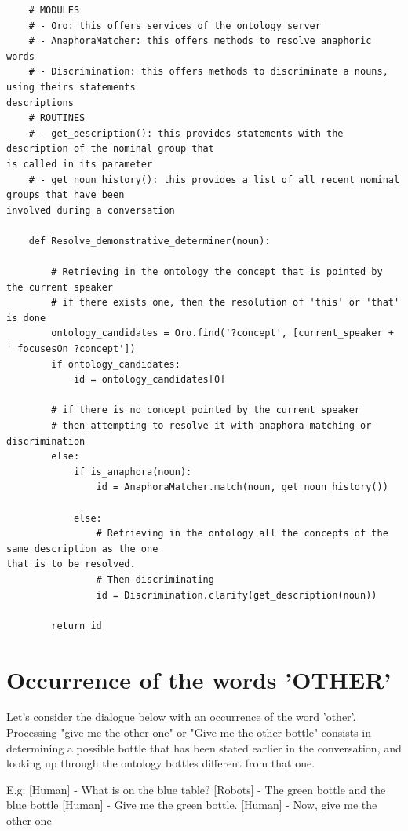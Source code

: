 \documentclass[twoside,a4paper,10pt]{report}
\newcommand{\dokutitleleveltree}[1]{\section{#1}}
\begin{document}
\lstset{language=python}
\begin{lstlisting}
    # MODULES
    # - Oro: this offers services of the ontology server
    # - AnaphoraMatcher: this offers methods to resolve anaphoric words
    # - Discrimination: this offers methods to discriminate a nouns, using theirs statements
descriptions
    # ROUTINES
    # - get_description(): this provides statements with the description of the nominal group that
is called in its parameter
    # - get_noun_history(): this provides a list of all recent nominal groups that have been
involved during a conversation 
    
    def Resolve_demonstrative_determiner(noun):
        
        # Retrieving in the ontology the concept that is pointed by the current speaker
        # if there exists one, then the resolution of 'this' or 'that' is done
        ontology_candidates = Oro.find('?concept', [current_speaker + ' focusesOn ?concept'])
        if ontology_candidates:
            id = ontology_candidates[0]
        
        # if there is no concept pointed by the current speaker
        # then attempting to resolve it with anaphora matching or discrimination
        else:
            if is_anaphora(noun):
                id = AnaphoraMatcher.match(noun, get_noun_history())
                
            else:
                # Retrieving in the ontology all the concepts of the same description as the one
that is to be resolved.
                # Then discriminating
                id = Discrimination.clarify(get_description(noun))
                    
        return id

\end{lstlisting}

\dokutitleleveltree{Occurrence of the words 'OTHER'}
\label{b7ebf691f8433bd42593d3ebb2d2c14a}%

Let's consider the dialogue below with an occurrence of the word 'other'. Processing "give me the other one" or "Give me the other bottle" consists in determining a possible bottle that has been stated earlier in the conversation, and looking up through the ontology bottles different from that one.


\small
\begin{verbatimtab}
  E.g:
  [Human]  - What is on the blue table?
  [Robots] - The green bottle and the blue bottle
  [Human]  - Give me the green bottle.
  [Human]  - Now, give me the other one 
\end{verbatimtab}
\normalsize
\end{document}
